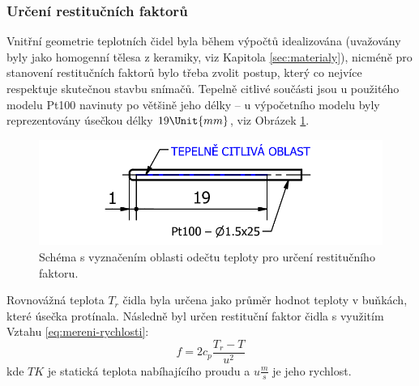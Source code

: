         \subsubsection{Určení restitučních faktorů}
            Vnitřní geometrie teplotních čidel byla během výpočtů idealizována (uvažovány byly jako homogenní tělesa z keramiky, viz Kapitola \ref{sec:materialy}), nicméně pro stanovení restitučních faktorů bylo třeba zvolit postup, který co nejvíce respektuje skutečnou stavbu snímačů. Tepelně citlivé součásti jsou u použitého modelu Pt100 navinuty po většině jeho délky – u výpočetního modelu byly reprezentovány úsečkou délky $19 \Unit{mm}$, viz Obrázek \ref{fig:odecet-tr}.

            \begin{figure} [ht!]
                \centering
                \includegraphics[width=.7\textwidth]{300_VYPOCETNI_MODEL/urceni_tr.png}
                \caption{Schéma s vyznačením oblasti odečtu teploty pro určení restitučního faktoru.}
                \label{fig:odecet-tr}
            \end{figure}

            Rovnovážná teplota $T_r$ čidla byla určena jako průměr hodnot teploty v buňkách, které úsečka protínala. Následně byl určen restituční faktor čidla s využitím Vztahu \ref{eq:mereni-rychlosti}:
            \begin{equation}
                f = 2 c_p \frac{T_r - T}{u ^2}
            \end{equation}
            \noindent kde $T \unit{K}$ je statická teplota nabíhajícího proudu a $u \unit{\frac{m}{s}}$ je jeho rychlost.

        
        